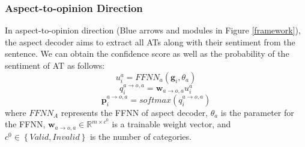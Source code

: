 \documentclass[11pt]{article}
\begin{document}
\subsubsection{Aspect-to-opinion Direction}
In aspect-to-opinion direction (Blue arrows and modules in Figure \ref{framework}), the aspect decoder aims to extract all ATs along with their sentiment from the sentence. We can obtain the confidence score as well as the probability of the sentiment of AT as follows:
\begin{equation} \label{aspect FFN}
	u^{a}_{i}=FFNN_{a}\left(\mathbf{g}_{i}, \theta_{a}\right)
\end{equation}
\begin{equation}
	q^{a\rightarrow o,a}_{i}=\mathbf{w}_{a\rightarrow o,a}u^{a}_{i}
\end{equation}
\begin{equation}
	\mathbf{p}^{a\rightarrow o,a}_{i}=softmax(q^{a\rightarrow o,a}_{i})
\end{equation}
where $FFNN_{A}$ represents the FFNN of aspect decoder, $\theta_{a}$ is the parameter for the FFNN, $\mathbf{w}_{a\rightarrow o,a}\in\mathbb{R}^{m\times c^{0}}$ is a trainable weight vector, and $c^{0}\in\left\{Valid, Invalid\right\}$ is the number of categories. 
\end{document}
